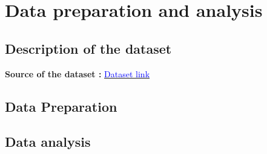\chapter{Data preparation and analysis}

\thispagestyle{empty}

\section{Description of the dataset}
\textbf{Source of the dataset :}  \href{}{\textcolor{blue}{Dataset link}}


\section{Data Preparation}


\section{Data analysis}
